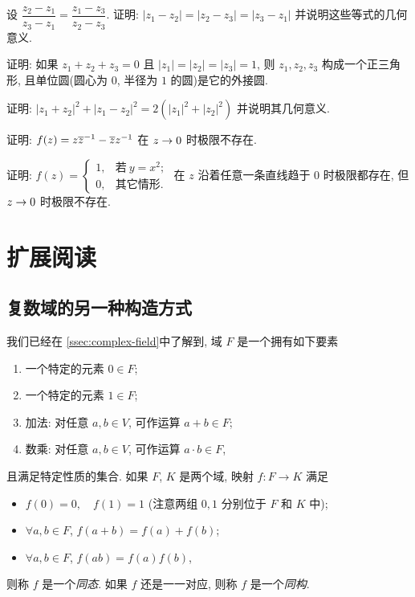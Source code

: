 \begin{homework}
\begin{subex}
    \item 设 $\dfrac{z_2-z_1}{z_3-z_1}=\dfrac{z_1-z_3}{z_2-z_3}$. 证明: $|z_1-z_2|=|z_2-z_3|=|z_3-z_1|$ 并说明这些等式的几何意义.
    \item 证明: 如果 $z_1+z_2+z_3=0$ 且 $|z_1|=|z_2|=|z_3|=1$, 则 $z_1,z_2,z_3$ 构成一个正三角形, 且单位圆(圆心为 $0$, 半径为 $1$ 的圆)是它的外接圆.
    \item 证明: $|z_1+z_2|^2+|z_1-z_2|^2=2(|z_1|^2+|z_2|^2)$ 并说明其几何意义.
    \item 证明: $f(z)=z{\overline z}^{-1}-\overline zz^{-1}$ 在 $z\rightarrow 0$ 时极限不存在.
    \item 证明: $f(z)=\begin{cases}
      1,&\text{若}\ y=x^2;\\
      0,&\text{其它情形}.
    \end{cases}$ 在 $z$ 沿着任意一条直线趋于 $0$ 时极限都存在, 但 $z\rightarrow0$ 时极限不存在.
  \end{subex}
\end{homework}



\newpage
\section{扩展阅读\optional}

\subsection{复数域的另一种构造方式}
\label{ssec:matrix-form-of-C}

我们已经在 \ref{ssec:complex-field}中了解到, 域 $F$ 是一个拥有如下要素
\begin{enumerate}
  \item 一个特定的元素 $0\in F$;
  \item 一个特定的元素 $1\in F$;
  \item 加法: 对任意 $a,b\in V$, 可作运算 $a+b\in F$;
  \item 数乘: 对任意 $a,b\in V$, 可作运算 $a\cdot b\in F$,
\end{enumerate}
且满足特定性质的集合.
如果 $F$, $K$ 是两个域, 映射 $f:F\to K$ 满足
\begin{itemize}
  \item $f(0)=0,\quad f(1)=1$ (注意两组 $0,1$ 分别位于 $F$ 和 $K$ 中);
  \item $\forall a,b\in F$, $f(a+b)=f(a)+f(b)$;
  \item $\forall a,b\in F$, $f(ab)=f(a)f(b)$,
\end{itemize}
则称 $f$ 是一个\emph{同态}.
如果 $f$ 还是一一对应, 则称 $f$ 是一个\emph{同构}.

